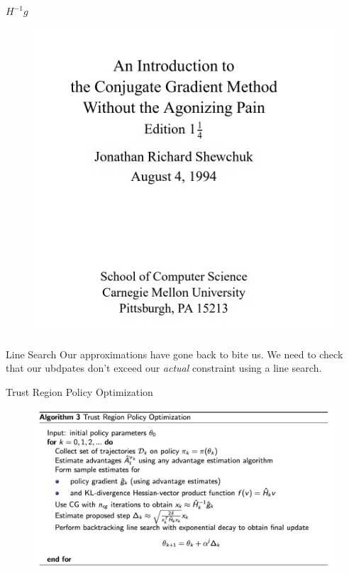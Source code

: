 \documentclass{beamer}
\begin{document}
\begin{frame}{$H^{-1}g$}

\begin{figure}
    \centering
    \includegraphics[width=1.1\linewidth]{trpo_funny_reference.png}
    \label{fig:joke}
\end{figure}    
\end{frame}

\begin{frame}{Line Search}
    Our approximations have gone back to bite us. We need to check that our ubdpates don't exceed our \textit{actual} constraint using a line search. 
\end{frame}


\begin{frame}{Trust Region Policy Optimization}
    
    \begin{figure}
        \centering
        \includegraphics[width=1\linewidth]{trpo_algorithm_pseudocode.png}
        \label{fig:algo_pseudocode}
    \end{figure}    

    
\end{frame}
\end{document}
